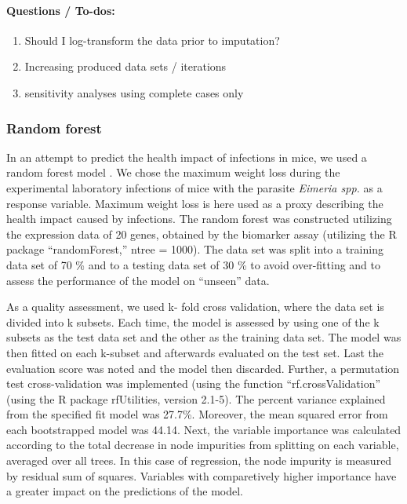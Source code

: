 \documentclass[webpdf,large,contemporary,namedate]{oup-authoring-template}
\providecommand{\tightlist}{%
  \setlength{\itemsep}{0pt}\setlength{\parskip}{0pt}}
\theoremstyle{thmstyleone}
\theoremstyle{thmstyletwo}
\theoremstyle{thmstylethree}
\begin{document}
\hypertarget{questions-to-dos}{%
\paragraph{Questions / To-dos:}\label{questions-to-dos}}

\begin{enumerate}
\def\labelenumi{\arabic{enumi}.}
\tightlist
\item
  Should I log-transform the data prior to imputation?
\item
  Increasing produced data sets / iterations
\item
  sensitivity analyses using complete cases only
\end{enumerate}

\hypertarget{random-forest}{%
\subsubsection{Random forest}\label{random-forest}}

In an attempt to predict the health impact of infections in mice, we
used a random forest model \citet{breiman2001random}. We chose the
maximum weight loss during the experimental laboratory infections of
mice with the parasite \emph{Eimeria spp.} as a response variable.
Maximum weight loss is here used as a proxy describing the health impact
caused by infections. The random forest was constructed utilizing the
expression data of 20 genes, obtained by the biomarker assay (utilizing
the R package ``randomForest,'' ntree = 1000). The data set was split
into a training data set of 70 \% and to a testing data set of 30 \% to
avoid over-fitting and to assess the performance of the model on
``unseen'' data.

As a quality assessment, we used k- fold cross validation, where the
data set is divided into k subsets. Each time, the model is assessed by
using one of the k subsets as the test data set and the other as the
training data set. The model was then fitted on each k-subset and
afterwards evaluated on the test set. Last the evaluation score was
noted and the model then discarded. Further, a permutation test
cross-validation was implemented (using the function
``rf.crossValidation'' (using the R package rfUtilities, version 2.1-5).
The percent variance explained from the specified fit model was 27.7\%.
Moreover, the mean squared error from each bootstrapped model was 44.14.
Next, the variable importance was calculated according to the total
decrease in node impurities from splitting on each variable, averaged
over all trees. In this case of regression, the node impurity is
measured by residual sum of squares. Variables with comparetively higher
importance have a greater impact on the predictions of the model.
\end{document}
